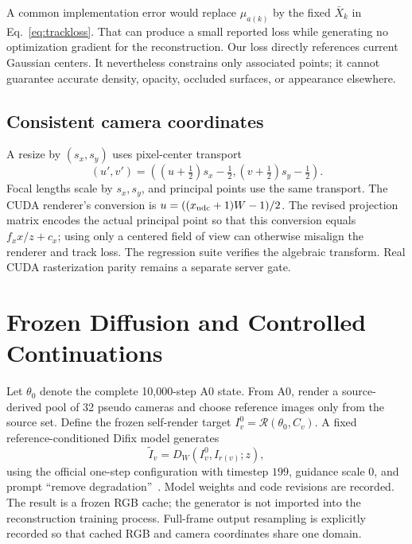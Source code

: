 \documentclass[10pt,twocolumn,letterpaper]{article}
\begin{document}
A common implementation error would replace $\mu_{a(k)}$ by the fixed $\bar X_k$ in Eq.~\eqref{eq:trackloss}. That can produce a small reported loss while generating no optimization gradient for the reconstruction. Our loss directly references current Gaussian centers. It nevertheless constrains only associated points; it cannot guarantee accurate density, opacity, occluded surfaces, or appearance elsewhere.

\subsection{Consistent camera coordinates}
A resize by $(s_x,s_y)$ uses pixel-center transport
\begin{equation}
(u',v')=((u+\tfrac12)s_x-\tfrac12,
(v+\tfrac12)s_y-\tfrac12).
\label{eq:pixelresize}
\end{equation}
Focal lengths scale by $s_x,s_y$, and principal points use the same transport. The CUDA renderer's conversion is $u=((x_{\rm ndc}+1)W-1)/2$. The revised projection matrix encodes the actual principal point so that this conversion equals $f_xx/z+c_x$; using only a centered field of view can otherwise misalign the renderer and track loss. The regression suite verifies the algebraic transform. Real CUDA rasterization parity remains a separate server gate.

\section{Frozen Diffusion and Controlled Continuations}
Let $\theta_0$ denote the complete 10,000-step A0 state. From A0, render a source-derived pool of 32 pseudo cameras and choose reference images only from the source set. Define the frozen self-render target $I^0_v=\mathcal R(\theta_0,C_v)$. A fixed reference-conditioned Difix model generates
\begin{equation}
\widetilde I_v=D_W(I^0_v,I_{r(v)};z),
\end{equation}
using the official one-step configuration with timestep $199$, guidance scale $0$, and prompt ``remove degradation''~\citep{wu2025difix}. Model weights and code revisions are recorded. The result is a frozen RGB cache; the generator is not imported into the reconstruction training process. Full-frame output resampling is explicitly recorded so that cached RGB and camera coordinates share one domain.
\end{document}
